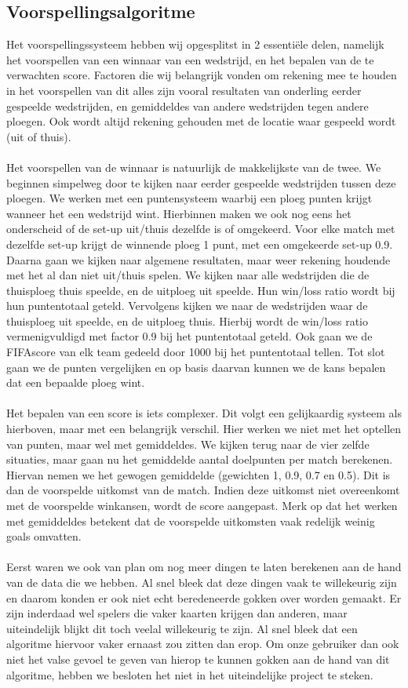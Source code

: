 \documentclass[11pt, a4paper]{article}
\begin{document}
\subsection{Voorspellingsalgoritme}
Het voorspellingssysteem hebben wij opgesplitst in 2 essenti\"ele delen, namelijk het voorspellen van een winnaar van een wedstrijd, en het bepalen van de te verwachten score. Factoren die wij belangrijk vonden om rekening mee te houden in het voorspellen van dit alles zijn vooral resultaten van onderling eerder gespeelde wedstrijden, en gemiddeldes van andere wedstrijden tegen andere ploegen. Ook wordt altijd rekening gehouden met de locatie waar gespeeld wordt (uit of thuis).
\\
\\
Het voorspellen van de winnaar is natuurlijk de makkelijkste van de twee. We beginnen simpelweg door te kijken naar eerder gespeelde wedstrijden tussen deze ploegen. We werken met een puntensysteem waarbij een ploeg punten krijgt wanneer het een wedstrijd wint. Hierbinnen maken we ook nog eens het onderscheid of de set-up uit/thuis dezelfde is of omgekeerd. Voor elke match met dezelfde set-up krijgt de winnende ploeg 1 punt, met een omgekeerde set-up 0.9.
Daarna gaan we kijken naar algemene resultaten, maar weer rekening houdende met het al dan niet uit/thuis spelen. We kijken naar alle wedstrijden die de thuisploeg thuis speelde, en de uitploeg uit speelde. Hun win/loss ratio wordt bij hun puntentotaal geteld. Vervolgens kijken we naar de wedstrijden waar de thuisploeg uit speelde, en de uitploeg thuis. Hierbij wordt de win/loss ratio vermenigvuldigd met factor 0.9 bij het puntentotaal geteld. Ook gaan we de FIFAscore van elk team gedeeld door 1000 bij het puntentotaal tellen. Tot slot gaan we de punten vergelijken en op basis daarvan kunnen we de kans bepalen dat een bepaalde ploeg wint.
\\
\\
Het bepalen van een score is iets complexer. Dit volgt een gelijkaardig systeem als hierboven, maar met een belangrijk verschil. Hier werken we niet met het optellen van punten, maar wel met gemiddeldes. We kijken terug naar de vier zelfde situaties, maar gaan nu het gemiddelde aantal doelpunten per match berekenen. Hiervan nemen we het gewogen gemiddelde (gewichten 1, 0.9, 0.7 en 0.5). Dit is dan de voorspelde uitkomst van de match. Indien deze uitkomst niet overeenkomt met de voorspelde winkansen, wordt de score aangepast. Merk op dat het werken met gemiddeldes betekent dat de voorspelde uitkomsten vaak redelijk weinig goals omvatten.
\\
\\
Eerst waren we ook van plan om nog meer dingen te laten berekenen aan de hand van de data die we hebben. Al snel bleek dat deze dingen vaak te willekeurig zijn en daarom konden er ook niet echt beredeneerde gokken over worden gemaakt. Er zijn inderdaad wel spelers die vaker kaarten krijgen dan anderen, maar uiteindelijk blijkt dit toch veelal willekeurig te zijn. Al snel bleek dat een algoritme hiervoor vaker ernaast zou zitten dan erop. Om onze gebruiker dan ook niet het valse gevoel te geven van hierop te kunnen gokken aan de hand van dit algoritme, hebben we besloten het niet in het uiteindelijke project te steken.
\end{document}
